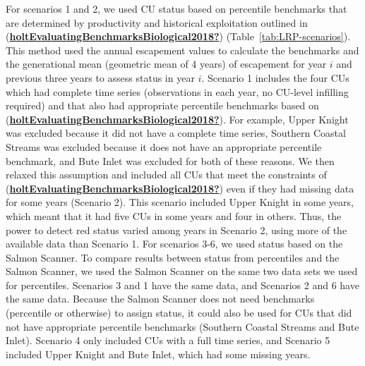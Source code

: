 \documentclass[11pt]{book}
\begin{document}
For scenarios 1 and 2, we used CU status based on percentile benchmarks that are determined by productivity and historical exploitation outlined in (\protect\hyperlink{ref-holtEvaluatingBenchmarksBiological2018}{\textbf{holtEvaluatingBenchmarksBiological2018?}}) (Table~\ref{tab:LRP-scenarios}). This method used the annual escapement values to calculate the benchmarks and the generational mean (geometric mean of 4 years) of escapement for year \(i\) and previous three years to assess status in year \(i\). Scenario 1 includes the four CUs which had complete time series (observations in each year, no CU-level infilling required) and that also had appropriate percentile benchmarks based on (\protect\hyperlink{ref-holtEvaluatingBenchmarksBiological2018}{\textbf{holtEvaluatingBenchmarksBiological2018?}}). For example, Upper Knight was excluded because it did not have a complete time series, Southern Coastal Streams was excluded because it does not have an appropriate percentile benchmark, and Bute Inlet was excluded for both of these reasons. We then relaxed this assumption and included all CUs that meet the constraints of (\protect\hyperlink{ref-holtEvaluatingBenchmarksBiological2018}{\textbf{holtEvaluatingBenchmarksBiological2018?}}) even if they had missing data for some years (Scenario 2). This scenario included Upper Knight in some years, which meant that it had five CUs in some years and four in others. Thus, the power to detect red status varied among years in Scenario 2, using more of the available data than Scenario 1. For scenarios 3-6, we used status based on the Salmon Scanner. To compare results between status from percentiles and the Salmon Scanner, we used the Salmon Scanner on the same two data sets we used for percentiles. Scenarios 3 and 1 have the same data, and Scenarios 2 and 6 have the same data. Because the Salmon Scanner does not need benchmarks (percentile or otherwise) to assign status, it could also be used for CUs that did not have appropriate percentile benchmarks (Southern Coastal Streams and Bute Inlet). Scenario 4 only included CUs with a full time series, and Scenario 5 included Upper Knight and Bute Inlet, which had some missing years.
\end{document}

